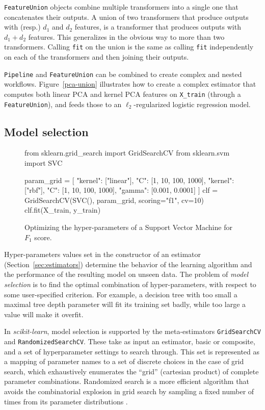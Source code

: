 \documentclass[twocolumn]{article}
\newcommand{\sklearn}{\textit{scikit-learn}\xspace}
\begin{document}
\texttt{FeatureUnion} objects combine multiple transformers into a single one
that concatenates their outputs. A union of two transformers that
produce outputs with (resp.) $d_1$ and $d_2$ features, is
a transformer that produces outputs with $d_1 + d_2$ features.
This generalizes in the obvious way to more than two transformers.
Calling \texttt{fit} on the union is the same as calling \texttt{fit}
independently on each of the transformers and then joining their outputs.

\texttt{Pipeline} and \texttt{FeatureUnion} can be
combined to create complex and nested workflows.
Figure~\ref{pca-union} illustrates how to create a complex estimator
that computes both linear PCA and kernel PCA features on \texttt{X\_train}
(through a \texttt{FeatureUnion}),
and feeds those to an $\ell_2$-regularized logistic regression model.

\subsection{Model selection}

\begin{figure*}[t]
\begin{pythoncode}
from sklearn.grid_search import GridSearchCV
from sklearn.svm import SVC

param_grid = [
  {"kernel": ["linear"], "C": [1, 10, 100, 1000]},
  {"kernel": ["rbf"], "C": [1, 10, 100, 1000],
   "gamma": [0.001, 0.0001]}
]
clf = GridSearchCV(SVC(), param_grid, scoring="f1", cv=10)
clf.fit(X_train, y_train)
\end{pythoncode}
\caption{Optimizing the hyper-parameters of a Support Vector Machine for $F_1$
score.}
\label{svm-gridsearch}
\end{figure*}

Hyper-parameters values set in the constructor of an estimator
(Section~\ref{sec:estimators})
determine the behavior of the learning algorithm
and the performance of the resulting model on unseen data.
The problem of \textit{model selection} is to find
the optimal combination of hyper-parameters, with
respect to some user-specified criterion. For example, a decision
tree with too small a maximal tree depth parameter will fit its training set badly,
while too large a value will make it overfit.

In \sklearn, model selection is supported by the meta-estimators
\texttt{GridSearchCV} and \texttt{RandomizedSearchCV}.  These take as input an
estimator, basic or composite,
and a set of hyperparameter settings to search through.
This set is represented as a mapping of parameter names
to a set of discrete choices in the case of grid search,
which exhaustively enumerates the ``grid'' (cartesian product)
of complete parameter combinations.
Randomized search is a more efficient algorithm
that avoids the combinatorial explosion in grid search
by sampling a fixed number of times from its parameter distributions
\citep{bergstra2012}.
\end{document}
